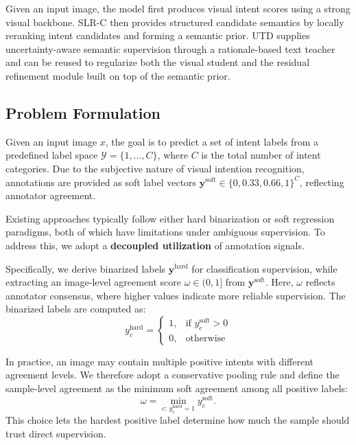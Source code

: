 Given an input image, the model first produces visual intent scores using a strong visual backbone. SLR-C then provides structured candidate semantics by locally reranking intent candidates and forming a semantic prior. UTD supplies uncertainty-aware semantic supervision through a rationale-based text teacher and can be reused to regularize both the visual student and the residual refinement module built on top of the semantic prior.

\subsection{Problem Formulation}

Given an input image $x$, the goal is to predict a set of intent labels from a predefined label space $\mathcal{Y}=\{1,\dots,C\}$, where $C$ is the total number of intent categories. Due to the subjective nature of visual intention recognition, annotations are provided as soft label vectors $\mathbf{y}^{\text{soft}} \in \{0, 0.33, 0.66, 1\}^C$, reflecting annotator agreement.

Existing approaches typically follow either hard binarization or soft regression paradigms, both of which have limitations under ambiguous supervision. To address this, we adopt a \textbf{decoupled utilization} of annotation signals.

Specifically, we derive binarized labels $\mathbf{y}^{\text{hard}}$ for classification supervision, while extracting an image-level agreement score $\omega \in (0,1]$ from $\mathbf{y}^{\text{soft}}$. Here, $\omega$ reflects annotator consensus, where higher values indicate more reliable supervision. The binarized labels are computed as:
\begin{equation}
y^{\text{hard}}_{c} =
\begin{cases}
1, & \text{if } y^{\text{soft}}_{c} > 0 \\
0, & \text{otherwise}
\end{cases}
\end{equation}

In practice, an image may contain multiple positive intents with different agreement levels. We therefore adopt a conservative pooling rule and define the sample-level agreement as the minimum soft agreement among all positive labels:
\begin{equation}
\omega = \min_{c:\, y^{\text{hard}}_{c}=1} y^{\text{soft}}_{c}.
\end{equation}
This choice lets the hardest positive label determine how much the sample should trust direct supervision.

